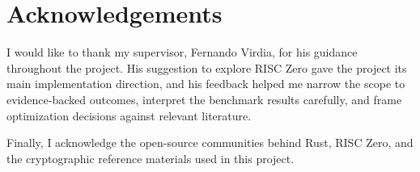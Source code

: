 
\chapter*{Acknowledgements}

I would like to thank my supervisor, Fernando Virdia, for his guidance
throughout the project. His suggestion to explore RISC Zero gave the project
its main implementation direction, and his feedback helped me narrow the scope
to evidence-backed outcomes, interpret the benchmark results carefully, and
frame optimization decisions against relevant literature.

Finally, I acknowledge the open-source communities behind Rust, RISC Zero, and
the cryptographic reference materials used in this project.
